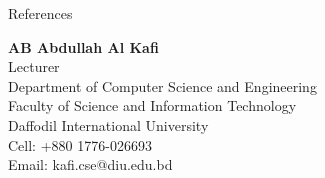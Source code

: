 \documentclass{resume} %
\begin{document}
\begin{rSection}{References}
\begin{minipage}[t]{0.48\textwidth}  %
\textbf{AB Abdullah Al Kafi} \\
Lecturer \\
Department of Computer Science and Engineering \\
Faculty of Science and Information Technology \\
Daffodil International University \\
Cell: +880 1776-026693 \\
Email: {kafi.cse@diu.edu.bd}
\end{minipage}%







\end{rSection}
\end{document}

